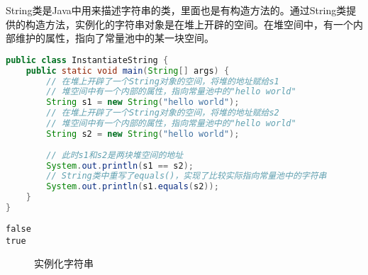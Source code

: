 String类是Java中用来描述字符串的类，里面也是有构造方法的。通过String类提供的构造方法，实例化的字符串对象是在堆上开辟的空间。在堆空间中，有一个内部维护的属性，指向了常量池中的某一块空间。 \\


\begin{lstlisting}[language=Java]
public class InstantiateString {
    public static void main(String[] args) {
        // 在堆上开辟了一个String对象的空间，将堆的地址赋给s1
        // 堆空间中有一个内部的属性，指向常量池中的"hello world"
        String s1 = new String("hello world");
        // 在堆上开辟了一个String对象的空间，将堆的地址赋给s2
        // 堆空间中有一个内部的属性，指向常量池中的"hello world"
        String s2 = new String("hello world");
        
        // 此时s1和s2是两块堆空间的地址
        System.out.println(s1 == s2);
        // String类中重写了equals()，实现了比较实际指向常量池中的字符串
        System.out.println(s1.equals(s2));
    }
}
\end{lstlisting}

\begin{tcolorbox}
	\begin{verbatim}
false
true
	\end{verbatim}
\end{tcolorbox}

\begin{figure}[H]
	\centering
	\caption{实例化字符串}
\end{figure}

\newpage

